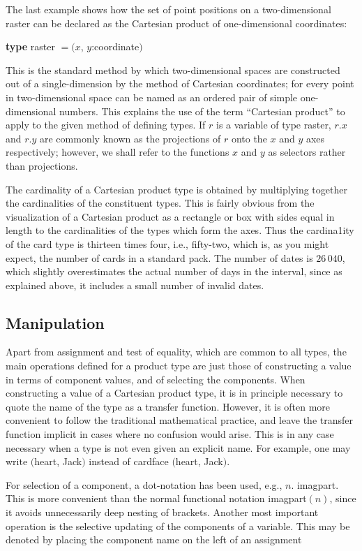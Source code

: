 The last example shows how the set of point positions on a two-dimensional raster can be declared as the Cartesian product of one-dimensional coordinates:

\quad \textbf{type} raster $= (x$, $y$:coordinate$)$

This is the standard method by which two-dimensional spaces are constructed out of a single-dimension by the method of Cartesian coordinates; for every point in two-dimensional space can be named as an ordered pair of simple one-dimensional numbers. This explains the use of the term ``Cartesian product'' to apply to the given method of defining types. If $r$ is a variable of type raster, $r.x$ and $r.y$ are commonly known as the projections of $r$ onto the $x$ and $y$ axes respectively; however, we shall refer to the functions $x$ and $y$ as selectors rather than projections.

The cardinality of a Cartesian product type is obtained by multiplying together the cardinalities of the constituent types. This is fairly obvious from the visualization of a Cartesian product as a rectangle or box with sides equal in length to the cardinalities of the types which form the axes. Thus the cardina1ity of the card type is thirteen times four, i.e., fifty-two, which is, as you might expect, the number of cards in a standard pack. The number of dates is $26\,040$, which slightly overestimates the actual number of days in the interval, since as explained above, it includes a small number of invalid dates.

\subsection{Manipulation}

Apart from assignment and test of equality, which are common to all types, the main operations defined for a product type are just those of constructing a value in terms of component values, and of selecting the components. When constructing a value of a Cartesian product type, it is in principle necessary to quote the name of the type as a transfer function. However, it is often more convenient to follow the traditional mathematical practice, and leave the transfer function implicit in cases where no confusion would arise. This is in any case necessary when a type is not even given an explicit name. For example, one may write $($heart, Jack$)$ instead of cardface $($heart, Jack$)$.

For selection of a component, a dot-notation has been used, e.g., $n$. imagpart. This is more convenient than the normal functional notation imagpart$(n)$, since it avoids unnecessarily deep nesting of brackets. Another most important operation is the selective updating of the components of a variable. This may be denoted by placing the component name on the left of an assignment

